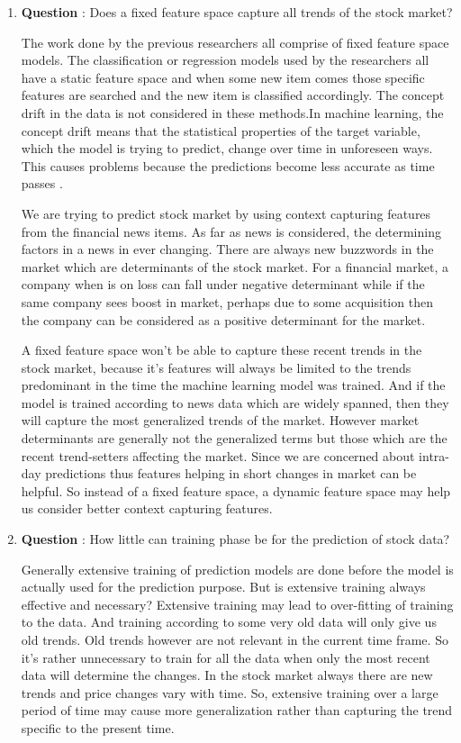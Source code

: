 \documentclass[a4paper,12bp]{report}
\begin{document}
\begin{enumerate}
\item \textbf{Question} : Does a fixed feature space capture all trends of the stock market?

The work done by the previous researchers all comprise of fixed feature space models. The classification or regression models used by the researchers all have a static feature space and when some new item comes those specific features are searched and the new item is classified accordingly. The concept drift in the data is not considered in these methods.In machine learning, the concept drift means that the statistical properties of the target variable, which the model is trying to predict, change over time in unforeseen ways. This causes problems because the predictions become less accurate as time passes \cite{ wiki:20146}. 

We are trying to predict stock market by using context capturing features from the financial news items. As far as news is considered, the determining factors in a news in ever changing. There are always new buzzwords in the market which are determinants of the stock market. For a financial market, a company when is on loss can fall under negative  determinant while if the same company sees boost in market, perhaps due to some acquisition then the company can be considered as a positive determinant for the market. 

A fixed feature space won't be able to capture these recent trends in the stock market, because it's features will always be limited to the trends predominant in the time the machine learning model was trained. And if the model is trained according to news data which are widely spanned, then they will capture the most generalized trends of the market. However market determinants are generally not the generalized terms but those which are the recent trend-setters affecting the market. Since we are concerned about intra-day predictions thus features helping in short changes in market can be helpful. So instead of a fixed feature space, a  dynamic feature space may help us consider better context capturing features. 

\item \textbf{Question} : How little can training phase be for the prediction of stock data?

Generally extensive training of prediction models are done before the model is actually used for the prediction purpose. But is extensive training always effective and necessary? Extensive training may lead to over-fitting of training to the data. And training according to some very old data will only give us old trends. Old trends however are not relevant in the current time frame. So it's rather unnecessary to train for all the data when only the most recent data will determine the changes. In the stock market always there are new trends and price changes vary with time. So, extensive training over a large period of time may cause more generalization rather than capturing the trend specific to the present time. 


\end{enumerate}
\end{document}
